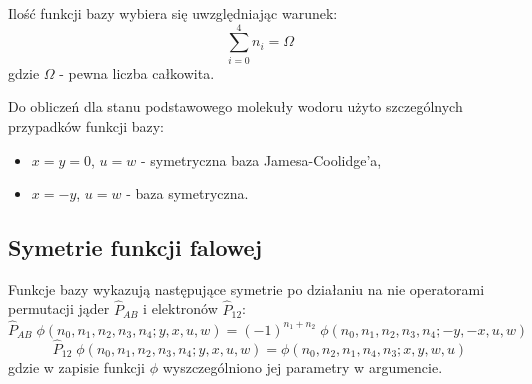 \documentclass[a4paper,12pt]{article}
\numberwithin{equation}{section}
\numberwithin{table}{section}
\numberwithin{figure}{section}
\begin{document}
Ilość funkcji bazy wybiera się uwzględniając warunek:
\begin{equation}
\sum\limits_{i=0}^4 n_i= \Omega
\end{equation}
gdzie $\Omega$ - pewna liczba całkowita.

Do obliczeń dla stanu podstawowego molekuły wodoru użyto szczególnych przypadków funkcji bazy:
\begin{itemize}
\item $x=y=0$, $u=w$ - symetryczna baza Jamesa-Coolidge'a,
\item $x=-y$, $u=w$ - baza symetryczna.
\end{itemize}

\subsection{Symetrie funkcji falowej} \label{sec:operatory}
Funkcje bazy wykazują następujące symetrie po działaniu na nie operatorami permutacji jąder $\hat{P}_{AB}$ i elektronów $\hat{P}_{12}$:
\begin{equation} 
	\hat{P}_{AB}\; \phi(n_0,n_1,n_2,n_3,n_4;y,x,u,w) = (-1)^{n_1+n_2}\;\phi(n_0,n_1,n_2,n_3,n_4;-y,-x,u,w)
\end{equation}
\begin{equation}
	\hat{P}_{12}\; \phi(n_0,n_1,n_2,n_3,n_4;y,x,u,w) = \phi(n_0,n_2,n_1,n_4,n_3;x,y,w,u)
\end{equation}
gdzie w zapisie funkcji $\phi$ wyszczególniono jej parametry w argumencie.
\end{document}
